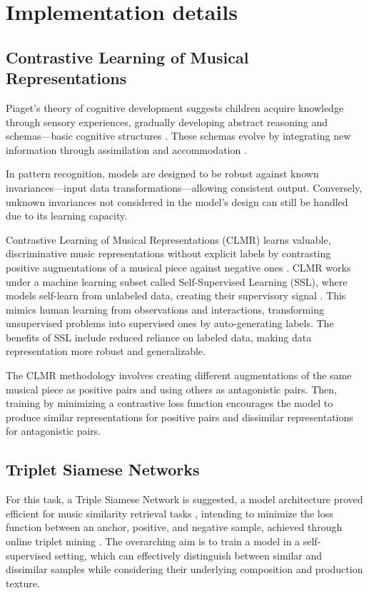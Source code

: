 \section{Implementation details}
\subsection{Contrastive Learning of Musical Representations}

Piaget's theory of cognitive development suggests children acquire knowledge through sensory experiences, gradually developing abstract reasoning and schemas—basic cognitive structures \cite{Huitt2003PiagetsDevelopment}. These schemas evolve by integrating new information through assimilation and accommodation \cite{audioselfsupsurvey}.

In pattern recognition, models are designed to be robust against known invariances—input data transformations—allowing consistent output. Conversely, unknown invariances not considered in the model's design can still be handled due to its learning capacity.

Contrastive Learning of Musical Representations (CLMR) learns valuable, discriminative music representations without explicit labels by contrasting positive augmentations of a musical piece against negative ones \cite{CLMR2021}. CLMR works under a machine learning subset called Self-Supervised Learning (SSL), where models self-learn from unlabeled data, creating their supervisory signal \cite{audioselfsupsurvey}. This mimics human learning from observations and interactions, transforming unsupervised problems into supervised ones by auto-generating labels. The benefits of SSL include reduced reliance on labeled data, making data representation more robust and generalizable.

The CLMR methodology involves creating different augmentations of the same musical piece as positive pairs and using others as antagonistic pairs. Then, training by minimizing a contrastive loss function encourages the model to produce similar representations for positive pairs and dissimilar representations for antagonistic pairs.


\subsection{Triplet Siamese Networks}

For this task, a Triple Siamese Network is suggested, a model architecture proved efficient for music similarity retrieval tasks \cite{contentmusicsimtriplet2020}, intending to minimize the loss function between an anchor, positive, and negative sample, achieved through online triplet mining \cite{Sikaroudi2020OfflinePatches}. The overarching aim is to train a model in a self-supervised setting, which can effectively distinguish between similar and dissimilar samples while considering their underlying composition and production texture. 


